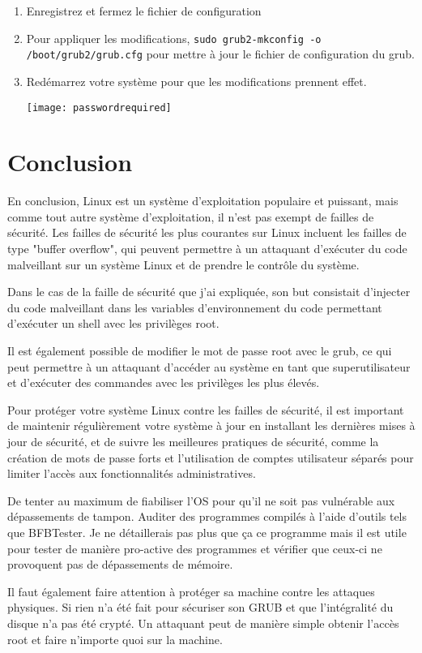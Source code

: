 \documentclass[12pt,a4paper]{article}
\newcommand{\code}[1]{\colorbox{light-gray}{\texttt{#1}}}
\begin{document}
\begin{enumerate}
\begin{lstlisting}
            \end{lstlisting}
            \item Enregistrez et fermez le fichier de configuration
            \item Pour appliquer les modifications, \code{sudo grub2-mkconfig -o /boot/grub2/grub.cfg} pour mettre à jour le fichier de configuration du grub.
            \item Redémarrez votre système pour que les modifications prennent effet.
            \begin{center}
                \texttt{[image: passwordrequired]}
            \end{center}
        \end{enumerate}
        
        \newpage
        \section{Conclusion}
        \begin{flushleft}
            \noindent En conclusion, Linux est un système d'exploitation populaire et puissant, mais comme tout autre système d'exploitation, il n'est pas exempt de failles de sécurité. Les failles de sécurité les plus courantes sur Linux incluent les failles de type "buffer overflow", qui peuvent permettre à un attaquant d'exécuter du code malveillant sur un système Linux et de prendre le contrôle du système.
            \item Dans le cas de la faille de sécurité que j'ai expliquée, son but consistait d'injecter du code malveillant dans les variables d'environnement du code permettant d'exécuter un shell avec les privilèges root.
            \item Il est également possible de modifier le mot de passe root avec le grub, ce qui peut permettre à un attaquant d'accéder au système en tant que superutilisateur et d'exécuter des commandes avec les privilèges les plus élevés. 
            \item Pour protéger votre système Linux contre les failles de sécurité, il est important de maintenir régulièrement votre système à jour en installant les dernières mises à jour de sécurité, et de suivre les meilleures pratiques de sécurité, comme la création de mots de passe forts et l'utilisation de comptes utilisateur séparés pour limiter l'accès aux fonctionnalités administratives.
            \item De tenter au maximum de fiabiliser l'OS pour qu'il ne soit pas vulnérable aux dépassements de tampon. Auditer des programmes compilés à l'aide d'outils tels que BFBTester. Je ne détaillerais pas plus que ça ce programme mais il est utile pour tester de manière pro-active des programmes et vérifier que ceux-ci ne provoquent pas de dépassements de mémoire.
            \item Il faut également faire attention à protéger sa machine contre les attaques physiques. Si rien n'a été fait pour sécuriser son GRUB et que l'intégralité du disque n'a pas été crypté. Un attaquant peut de manière simple obtenir l'accès root et faire n'importe quoi sur la machine.
        \end{flushleft}

        \newpage
        \nocite{*}
	
	
\end{document}
